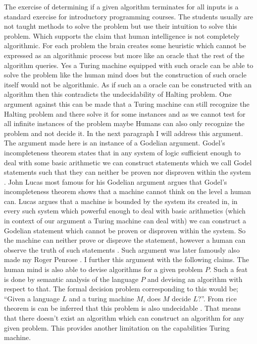 \documentclass[11pt,a4paper]{article}
\begin{document}
The exercise of determining if a given algorithm terminates for all inputs is a standard exercise for introductory programming courses. The students usually are not taught methods to solve the problem but use their intuition to solve this problem. Which supports the claim that human intelligence is not completely algorithmic. 
For each problem the brain creates some heuristic which cannot be expressed as an algorithmic process but more like an oracle that the rest of the algorithm queries. Yes a Turing machine equipped with such oracle can be able to solve the problem like the human mind does but the construction of such oracle itself would not be algorithmic. 
As if such an a oracle can be constructed with an algorithm then this contradicts the undecidability of Halting problem. 
One argument against this can be made that a Turing machine can still recognize the Halting problem and there solve it for some instances and as we cannot test for all infinite instances of the problem maybe Humans can also only recognize the problem and not decide it. In the next paragraph I will address this argument.
The argument made here is an instance of a Godelian argument. Godel's incompleteness theorem states that in any system of logic sufficient enough to deal with some basic arithmetic we can construct statements which we call Godel statements such that they can neither be proven nor disproven within the system \cite{Godel31}.
John Lucas most famous for his Godelian argument argues that Godel's incompleteness theorem shows that a machine cannot think on the level a human can. Lucas argues that a machine is bounded by the system its created in, in every such system which powerful enough to deal with basic arithmetics (which in context of our argument a Turing machine can deal with) we can construct a Godelian statement which cannot be proven or disproven within the system.
So the machine can neither prove or disprove the statement, however a human can observe the truth of such statements \cite{Lucas}. Such argument was later famously also made my Roger Penrose \cite{penrose}.
I further this argument with the following claims. The human mind is also able to devise algorithms for a given problem $P$. 
Such a feat is done by semantic analysis of the language $P$ and devising an algorithm with respect to that. The formal decision problem corresponding to this would be; ``Given a language $L$ and a turing machine $M$, does $M$ decide $L$?''. From rice theorem is can be inferred that this problem is also undecidable \cite{Rice53}\cite[,241 ]{sipser13}.
That means that there doesn't exist an algorithm which can construct an algorithm for any given problem. This provides another limitation on the capabilities Turing machine.
\end{document}
